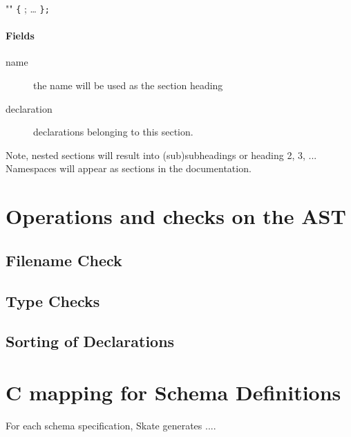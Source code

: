 \documentclass[a4paper,11pt,twoside]{report}
\begin{document}
{{\begin{syntax}
 ""  \verb+{+
    ;
    \ldots
\verb+};+
\end{syntax}

\subsubsection{Fields}

\begin{description}
    \item[name] the name will be used as the section heading
    \item[declaration] declarations belonging to this section. 
\end{description}

Note, nested sections will result into (sub)subheadings or heading 2, 3, ...
Namespaces will appear as sections in the documentation.


\chapter{Operations and checks on the AST}
\label{chap:astops}

\section{Filename Check}

\section{Type Checks}

\section{Sorting of Declarations}


\chapter{C mapping for Schema Definitions}
\label{chap:cmapping}

For each schema specification, Skate generates ....

}}
\end{document}
